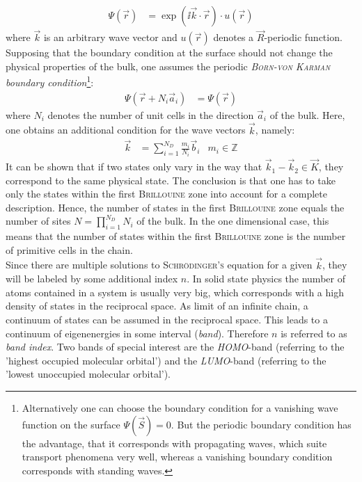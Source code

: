 \begin{align}
	\Psi(\vec{r}) &= \exp\left(\ii\vec{k}\cdot\vec{r}\right) \cdot u\left(\vec{r}\right)
\end{align}
where $\vec{k}$ is an arbitrary wave vector and $u\left(\vec{r}\right)$ denotes a $\vec{R}$-periodic function.\\
Supposing that the boundary condition at the surface should not change the physical properties of the bulk, one assumes the periodic \emph{\textsc{Born-von Karman} boundary condition}\footnote{Alternatively one can choose the boundary condition  for a vanishing wave function on the surface $\Psi\left(\vec{S}\right) = 0$. But the periodic boundary condition has the advantage, that it corresponds with propagating waves, which suite transport phenomena very well, whereas a vanishing boundary condition corresponds with standing waves.}:
\begin{align}
	\Psi\left(\vec{r} + N_i \vec{a}_i\right) &= \Psi\left(\vec{r}\right)
\end{align}
where $N_i$ denotes the number of unit cells in the direction $\vec{a}_i$ of the bulk. Here, one obtains an additional condition for the wave vectors $\vec{k}$, namely:
\begin{align}
	\vec{k} &= \sum_{i = 1}^{N_D} \frac{m_i}{N_i} \vec{b}_i & m_i \in \mathbb{Z} 
\end{align}
It can be shown that if two states only vary in the way that $\vec{k}_1 - \vec{k}_2 \in \vec{K}$, they correspond to the same physical state. The conclusion is that one has to take only the states within the first \textsc{Brillouine} zone into account for a complete description. Hence, the number of states in the first \textsc{Brillouine} zone equals the number of sites $N = \prod_{i = 1}^{N_D}N_i$ of the bulk. In the one dimensional case, this means that the number of states within the first \textsc{Brillouine} zone is the number of primitive cells in the chain.\\
Since there are multiple solutions to \textsc{Schrödinger's} equation for a given $\vec{k}$, they will be labeled by some additional index $n$. In solid state physics the number of atoms contained in a system is usually very big, which corresponds with a high density of states in the reciprocal space. As limit of an infinite chain, a continuum of states can be assumed in the reciprocal space. This leads to a continuum of eigenenergies in some interval (\emph{band}). Therefore $n$ is referred to as \emph{band index}. Two bands of special interest are the \emph{HOMO}-band (referring to the 'highest occupied molecular orbital') and the \emph{LUMO}-band (referring to the 'lowest unoccupied molecular orbital').

